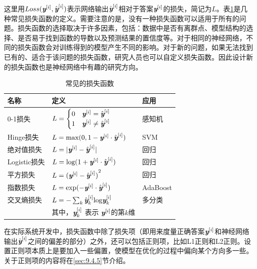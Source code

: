 \parinterval 这里用$ Loss({\textbf{\em y}}^{[i]},{\hat{\textbf{\em y}}}^{[i]}) $表示网络输出$ {\hat{\textbf{\em y}}}^{[i]} $相对于答案$ {\textbf{\em y}}^{[i]} $的损失，简记为$ L $。表\ref{tab:9-3}是几种常见损失函数的定义。需要注意的是，没有一种损失函数可以适用于所有的问题。损失函数的选择取决于许多因素，包括：数据中是否有离群点、模型结构的选择、是否易于找到函数的导数以及预测结果的置信度等。对于相同的神经网络，不同的损失函数会对训练得到的模型产生不同的影响。对于新的问题，如果无法找到已有的、适合于该问题的损失函数，研究人员也可以自定义损失函数。因此设计新的损失函数也是神经网络中有趣的研究方向。

\begin{table}[htp]
\centering
\caption{常见的损失函数}
\label{tab:9-3}
\small
\begin{tabular}{l | l l}
\rule{0pt}{15pt}     名称 & 定义 & 应用  \\
\hline
\rule{0pt}{15pt}     0-1损失 & $ L=\begin{cases} 0 & {\textbf{\em y}}^{[i]}={\hat{\textbf{\em y}}}^{[i]} \\1 & {\textbf{\em y}}^{[i]}\not ={\hat{\textbf{\em y}}}^{[i]}\end{cases} $ & 感知机  \\
\rule{0pt}{15pt}     Hinge损失 & $ L={\textrm {max}}(0,1-{\textbf{\em y}}^{[i]}\cdot {\hat{\textbf{\em y}}}^{[i]}) $ & SVM  \\
\rule{0pt}{15pt}     绝对值损失 & $ L=\vert {\textbf{\em y}}^{[i]}-{\hat{\textbf{\em y}}}^{[i]}\vert $ & 回归  \\
\rule{0pt}{15pt}     Logistic损失 & $ L={\textrm{log}}(1+{\textbf{\em y}}^{[i]}\cdot {\hat{\textbf{\em y}}}^{[i]}) $ & 回归  \\
\rule{0pt}{15pt}     平方损失 & $ L={({\textbf{\em y}}^{[i]}-{\hat{\textbf{\em y}}}^{[i]})}^2 $ & 回归  \\
\rule{0pt}{15pt}     指数损失 & $ L={\textrm{exp}}(-{\textbf{\em y}}^{[i]}\cdot{\hat{\textbf{\em y}}}^{[i]}) $ & AdaBoost  \\
\rule{0pt}{15pt}     交叉熵损失 & $ L=-\sum_{k}{\hat{\textbf{\em y}}}^{[i]}_{k}{\textrm {log}} {\textbf{\em y}}^{[i]}_{k} $ & 多分类  \\
\rule{0pt}{15pt}     & 其中，${\textbf{\em y}}^{[i]}_{k}$ 表示 ${\textbf{\em y}}^{[i]}$的第$k$维
\end{tabular}
\end{table}

\parinterval 在实际系统开发中，损失函数中除了损失项（即用来度量正确答案$ {\textbf{\em y}}^{[i]} $和神经网络输出$ {\hat{\textbf{\em y}}}^{[i]} $之间的偏差的部分）之外，还可以包括正则项，比如L1正则和L2正则。设置正则项本质上是要加入一些偏置，使模型在优化的过程中偏向某个方向多一些。关于正则项的内容将在\ref{sec:9.4.5}节介绍。

